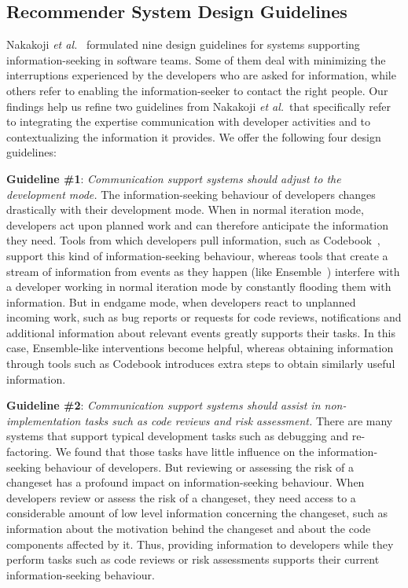 \documentclass{sig-alternate}
\begin{document}
\subsection{Recommender System Design Guidelines}
\label{sec:sub:tools}
Nakakoji \emph{et al.}~\cite{nakakoji:code:2010} formulated nine design guidelines for systems supporting information-seeking in software teams. Some of them deal with minimizing the interruptions experienced by the developers who are asked for information, while others refer to enabling the information-seeker to contact the right people. Our findings help us refine two guidelines from Nakakoji \emph{et al.}~that specifically refer to integrating the expertise communication with developer activities and to contextualizing the information it provides. We offer the following four design guidelines:


\textbf{Guideline \#1}: \emph{Communication support systems should adjust to the development mode.}
The information-seeking behaviour of developers changes drastically with their development mode. When in normal iteration mode, developers act upon planned work and can therefore anticipate the information they need. Tools from which developers pull information, such as Codebook~\cite{begel:icse:2010}, support this kind of information-seeking behaviour, whereas tools that create a stream of information from events as they happen (like Ensemble~\cite{xiang:rsse:2008}) interfere with a developer working in normal iteration mode by constantly flooding them with information.
%
But in endgame mode, when developers react to unplanned incoming work, such as bug reports or requests for code reviews, notifications and additional information about relevant events greatly supports their tasks. In this case, Ensemble-like interventions become helpful, whereas obtaining information through tools such as Codebook introduces extra steps to obtain similarly useful information.

\textbf{Guideline \#2}: \emph{Communication support systems should assist in non-implementation tasks such as code reviews and risk assessment.} 
There are many systems that support typical development tasks such as debugging and re-factoring. We found that those tasks have little influence on the information-seeking behaviour of developers. But reviewing or assessing the risk of a changeset has a profound impact on information-seeking behaviour. When developers review or assess the risk of a changeset, they need access to a considerable amount of low level information concerning the changeset, such as information about the motivation behind the changeset and about the code components affected by it. Thus, providing information to developers while they perform tasks such as code reviews or risk assessments supports their current information-seeking behaviour.
\end{document}
